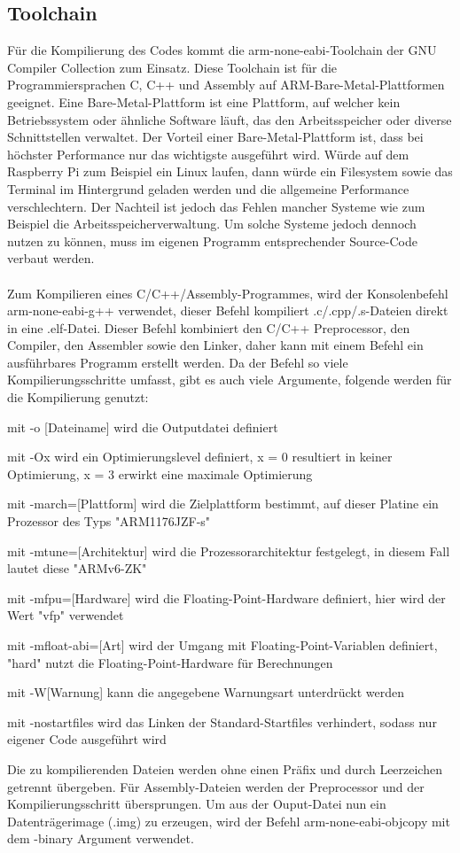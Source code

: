 \documentclass[12pt]{article}
\begin{document}
\subsection{Toolchain}
Für die Kompilierung des Codes kommt die arm-none-eabi-Toolchain der GNU Compiler Collection zum Einsatz. Diese Toolchain ist für die Programmiersprachen C, C++ und Assembly auf ARM-Bare-Metal-Plattformen geeignet. Eine Bare-Metal-Plattform ist eine Plattform, auf welcher kein Betriebssystem oder ähnliche Software läuft, das den Arbeitsspeicher oder diverse Schnittstellen verwaltet. Der Vorteil einer Bare-Metal-Plattform ist, dass bei höchster Performance nur das wichtigste ausgeführt wird. Würde auf dem Raspberry Pi zum Beispiel ein Linux laufen, dann würde ein Filesystem sowie das Terminal im Hintergrund geladen werden und die allgemeine Performance verschlechtern. Der Nachteil ist jedoch das Fehlen mancher Systeme wie zum Beispiel die Arbeitsspeicherverwaltung. Um solche Systeme jedoch dennoch nutzen zu können, muss im eigenen Programm entsprechender Source-Code verbaut werden.
\\\\Zum Kompilieren eines C/C++/Assembly-Programmes, wird der Konsolenbefehl arm-none-eabi-g++ verwendet, dieser Befehl kompiliert .c/.cpp/.s-Dateien direkt in eine .elf-Datei. Dieser Befehl kombiniert den C/C++ Preprocessor, den Compiler, den Assembler sowie den Linker, daher kann mit einem Befehl ein ausführbares Programm erstellt werden. Da der Befehl so viele Kompilierungsschritte umfasst, gibt es auch viele Argumente, folgende werden für die Kompilierung genutzt:
\begin{compactitem}
    \item mit -o [Dateiname] wird die Outputdatei definiert
    \item mit -Ox wird ein Optimierungslevel definiert, x = 0 resultiert in keiner Optimierung, x = 3 erwirkt eine maximale Optimierung
    \item mit -march=[Plattform] wird die Zielplattform bestimmt, auf dieser Platine ein Prozessor des Typs "ARM1176JZF-s"
    \item mit -mtune=[Architektur] wird die Prozessorarchitektur festgelegt, in diesem Fall lautet diese "ARMv6-ZK"
    \item mit -mfpu=[Hardware] wird die Floating-Point-Hardware definiert, hier wird der Wert "vfp" verwendet
    \item mit -mfloat-abi=[Art] wird der Umgang mit Floating-Point-Variablen definiert, "hard" nutzt die Floating-Point-Hardware für Berechnungen
    \item mit -W[Warnung] kann die angegebene Warnungsart unterdrückt werden
    \item mit -nostartfiles wird das Linken der Standard-Startfiles verhindert, sodass nur eigener Code ausgeführt wird
\end{compactitem}
Die zu kompilierenden Dateien werden ohne einen Präfix und durch Leerzeichen getrennt übergeben. Für Assembly-Dateien werden der Preprocessor und der Kompilierungsschritt übersprungen. Um aus der Ouput-Datei nun ein Datenträgerimage (.img) zu erzeugen, wird der Befehl arm-none-eabi-objcopy mit dem -binary Argument verwendet.
\end{document}
